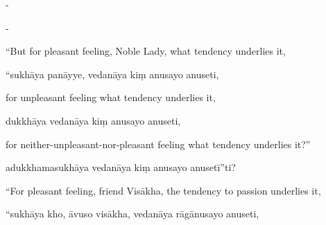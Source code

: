 \begin{samepage}
\begin{leftcolumn*}
-
\end{leftcolumn*}

\begin{rightcolumn}
-
\end{rightcolumn}
\end{samepage}

\begin{samepage}
\begin{leftcolumn*}
“But for pleasant feeling, Noble Lady, what tendency underlies it,
\end{leftcolumn*}

\begin{rightcolumn}
“sukhāya panāyye, vedanāya kiṃ anusayo anuseti,
\end{rightcolumn}
\end{samepage}

\begin{samepage}
\begin{leftcolumn*}
for unpleasant feeling what tendency underlies it,
\end{leftcolumn*}

\begin{rightcolumn}
dukkhāya vedanāya kiṃ anusayo anuseti,
\end{rightcolumn}
\end{samepage}

\begin{samepage}
\begin{leftcolumn*}
for neither-unpleasant-nor-pleasant feeling what tendency underlies it?”
\end{leftcolumn*}

\begin{rightcolumn}
adukkhamasukhāya vedanāya kiṃ anusayo anusetī”ti?
\end{rightcolumn}
\end{samepage}

\begin{samepage}
\begin{leftcolumn*}
“For pleasant feeling, friend Visākha, the tendency to passion underlies it,
\end{leftcolumn*}

\begin{rightcolumn}
“sukhāya kho, āvuso visākha, vedanāya rāgānusayo anuseti,
\end{rightcolumn}
\end{samepage}

